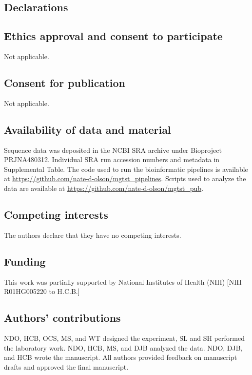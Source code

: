 \documentclass[linenumbers]{bmcart}
\begin{document}
\begin{backmatter}

\section*{Declarations}

\subsection*{Ethics approval and consent to participate}
Not applicable.

\subsection*{Consent for publication}
Not applicable.

\subsection*{Availability of data and material}
Sequence data was deposited in the NCBI SRA archive under Bioproject
PRJNA480312.
Individual SRA run accession numbers and metadata in Supplemental Table.
The code used to run the bioinformatic pipelines is available at
\url{https://github.com/nate-d-olson/mgtst_pipelines}.
Scripts used to analyze the data are available at
\url{https://github.com/nate-d-olson/mgtst_pub}.

\subsection*{Competing interests}
The authors declare that they have no competing interests.

\subsection*{Funding}
This work was partially supported by National Institutes of Health (NIH)
{[}NIH R01HG005220 to H.C.B.{]}

\subsection*{Authors' contributions}
NDO, HCB, OCS, MS, and WT designed the experiment, SL and SH performed the laboratory work.
NDO, HCB, MS, and DJB analyzed the data.
NDO, DJB, and HCB wrote the manuscript.
All authors provided feedback on manuscript drafts and approved the final manuscript.



\end{backmatter}
\end{document}
